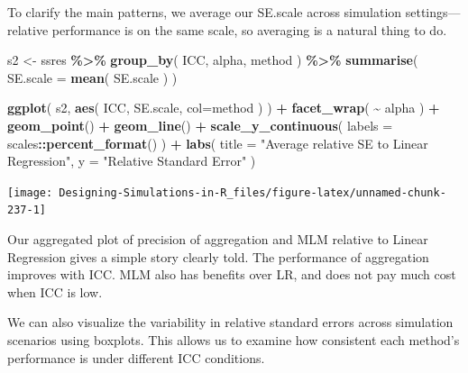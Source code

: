 \documentclass[
]{book}
\newenvironment{Shaded}{\begin{snugshade}}{\end{snugshade}}
\newcommand{\AttributeTok}[1]{\textcolor[rgb]{0.13,0.29,0.53}{#1}}
\newcommand{\FunctionTok}[1]{\textcolor[rgb]{0.13,0.29,0.53}{\textbf{#1}}}
\newcommand{\NormalTok}[1]{#1}
\newcommand{\OtherTok}[1]{\textcolor[rgb]{0.56,0.35,0.01}{#1}}
\newcommand{\SpecialCharTok}[1]{\textcolor[rgb]{0.81,0.36,0.00}{\textbf{#1}}}
\newcommand{\StringTok}[1]{\textcolor[rgb]{0.31,0.60,0.02}{#1}}
\begin{document}
To clarify the main patterns, we average our SE.scale across simulation settings---relative performance is on the same scale, so averaging is a natural thing to do.

\begin{Shaded}
\begin{Highlighting}[]
\NormalTok{s2 }\OtherTok{\textless{}{-}} 
\NormalTok{  ssres }\SpecialCharTok{\%\textgreater{}\%} 
  \FunctionTok{group\_by}\NormalTok{( ICC, alpha, method ) }\SpecialCharTok{\%\textgreater{}\%}
  \FunctionTok{summarise}\NormalTok{( }\AttributeTok{SE.scale =} \FunctionTok{mean}\NormalTok{( SE.scale ) )}

\FunctionTok{ggplot}\NormalTok{( s2, }\FunctionTok{aes}\NormalTok{( ICC, SE.scale, }\AttributeTok{col=}\NormalTok{method ) ) }\SpecialCharTok{+}
  \FunctionTok{facet\_wrap}\NormalTok{( }\SpecialCharTok{\textasciitilde{}}\NormalTok{ alpha ) }\SpecialCharTok{+}
  \FunctionTok{geom\_point}\NormalTok{() }\SpecialCharTok{+} \FunctionTok{geom\_line}\NormalTok{() }\SpecialCharTok{+}
  \FunctionTok{scale\_y\_continuous}\NormalTok{( }\AttributeTok{labels =}\NormalTok{ scales}\SpecialCharTok{::}\FunctionTok{percent\_format}\NormalTok{() ) }\SpecialCharTok{+}
  \FunctionTok{labs}\NormalTok{( }\AttributeTok{title =} \StringTok{"Average relative SE to Linear Regression"}\NormalTok{,}
        \AttributeTok{y =} \StringTok{"Relative Standard Error"}\NormalTok{ )}
\end{Highlighting}
\end{Shaded}

\begin{center}\texttt{[image: Designing-Simulations-in-R\_files/figure-latex/unnamed-chunk-237-1]} \end{center}

Our aggregated plot of precision of aggregation and MLM relative to Linear Regression gives a simple story clearly told.
The performance of aggregation improves with ICC.
MLM also has benefits over LR, and does not pay much cost when ICC is low.

We can also visualize the variability in relative standard errors across simulation scenarios using boxplots.
This allows us to examine how consistent each method's performance is under different ICC conditions.
\end{document}
